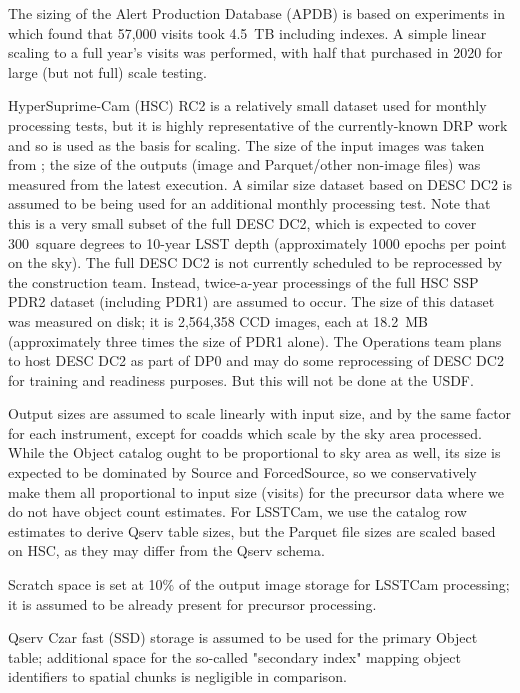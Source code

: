 The sizing of the Alert Production Database (APDB) is based on experiments in \cite{DMTN-113} which found that 57,000 visits took 4.5~TB including indexes.
A simple linear scaling to a full year's visits was performed, with half that purchased in 2020 for large (but not full) scale testing.

HyperSuprime-Cam (HSC) RC2 is a relatively small dataset used for monthly processing tests, but it is highly representative of the currently-known DRP work and so is used as the basis for scaling.
The size of the input images was taken from \cite{DMTN-091}; the size of the outputs (image and Parquet/other non-image files) was measured from the latest execution.
A similar size dataset based on DESC DC2 is assumed to be being used for an additional monthly processing test.
Note that this is a very small subset of the full DESC DC2, which is expected to cover 300~square degrees to 10-year LSST depth (approximately 1000 epochs per point on the sky).
The full DESC DC2 is not currently scheduled to be reprocessed by the construction team.
Instead, twice-a-year processings of the full HSC SSP PDR2 dataset (including PDR1) are assumed to occur.
The size of this dataset was measured on disk; it is 2,564,358 CCD images, each at 18.2~MB (approximately three times the size of PDR1 alone). The Operations
team plans to host DESC DC2 as part of DP0 and may do some reprocessing of
DESC DC2 for training and readiness purposes. But this will not be done at
the \gls{USDF}.

Output sizes are assumed to scale linearly with input size, and by the same factor for each instrument, except for coadds which scale by the sky area processed.
While the Object catalog ought to be proportional to sky area as well, its size is expected to be dominated by Source and ForcedSource, so we conservatively make them all proportional to input size (visits) for the precursor data where we do not have object count estimates.
For LSSTCam, we use the catalog row estimates to derive Qserv table sizes, but the Parquet file sizes are scaled based on HSC, as they may differ from the Qserv schema.

Scratch space is set at 10\% of the output image storage for LSSTCam processing; it is assumed to be already present for precursor processing.

Qserv Czar fast (SSD) storage is assumed to be used for the primary Object table; additional space for the so-called "secondary index" mapping object identifiers to spatial chunks is negligible in comparison.


